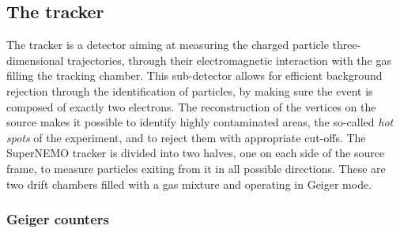 \subsection{The tracker}
\label{subsec:tracker}

The tracker is a detector aiming at measuring the charged particle three-dimensional trajectories, through their electromagnetic interaction with the gas filling the tracking chamber.
This sub-detector allows for efficient background rejection through the identification of particles, by making sure the event is composed of exactly two electrons.
The reconstruction of the vertices on the source makes it possible to identify highly contaminated areas, the so-called \emph{hot spots} of the experiment, and to reject them with appropriate cut-offs.
The SuperNEMO tracker is divided into two halves, one on each side of the source frame, to measure particles exiting from it in all possible directions.
These are two drift chambers filled with a gas mixture and operating in Geiger mode.

\subsubsection*{Geiger counters}


